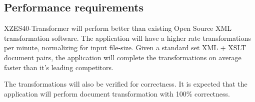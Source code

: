 \subsection{Performance requirements}
%

XZES40-Transformer will perform better than existing Open Source XML transformation software.
The application will have a higher rate transformations per minute, normalizing for input file-size.
Given a standard set XML + XSLT document pairs, the application will complete the transformations on average faster than it's leading competitors.

The transformations will also be verified for correctness.
It is expected that the application will perform document transformation with 100\% correctness.


    
